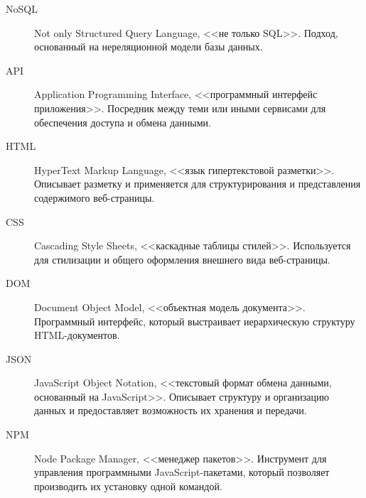 \Abbreviations %
\begin{description}
\item[NoSQL] Not only Structured Query Language, <<не только SQL>>. Подход, основанный на нереляционной модели базы данных.
\item[API] Application Programming Interface, <<программный интерфейс приложения>>. Посредник между теми или иными сервисами для обеспечения доступа и обмена данными.
\item[HTML] HyperText Markup Language, <<язык гипертекстовой разметки>>. Описывает разметку и применяется для структурирования и представления содержимого веб-страницы.
\item[CSS] Cascading Style Sheets, <<каскадные таблицы стилей>>. Используется для стилизации и общего оформления внешнего вида веб-страницы.
\item[DOM] Document Object Model, <<объектная модель документа>>. Программный интерфейс, который выстраивает иерархическую структуру HTML-документов.
\item[JSON] JavaScript Object Notation, <<текстовый формат обмена данными, основанный на JavaScript>>. Описывает структуру и организацию данных и предоставляет возможность их хранения и передачи.
\item[NPM] Node Package Manager, <<менеджер пакетов>>. Инструмент для управления программными JavaScript-пакетами, который позволяет производить их установку одной командой.
\end{description}

